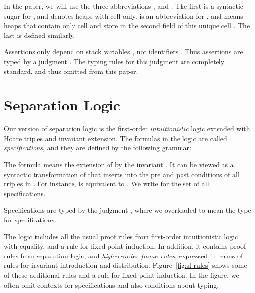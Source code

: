 \documentclass{LMCS}
\begin{document}
In the paper, we will use the three abbreviations 
, 
and . The first
 is a syntactic sugar for 
, and denotes heaps
with cell  only.
 is an abbreviation for
, and means
 heaps that contain only cell  and
store  in the second field of this unique cell .
The last  is defined similarly.

Assertions only depend on stack variables , not identifiers .
Thus assertions are typed by a judgment .  The typing rules for this judgment are completely standard, and
thus omitted from this paper.


\section{Separation Logic}
\label{sec:separation-logic}
Our version of separation logic is the first-order 
{\em intuitionistic\/} logic extended with Hoare triples 
and invariant extension.
The formulas in the logic are called {\em specifications},
and they are defined by the following grammar:
{

}
The formula  means
the extension of  by the invariant .
It can be viewed as 
a syntactic transformation of  that 
inserts  into the pre and post conditions of all triples 
in .  For instance, 
 is 
equivalent to 
.
We write  for the set of all specifications.

Specifications are typed by the judgment 
, where we
overloaded  to mean the type for specifications.

The logic includes all the usual proof rules from first-order
intuitionistic logic with equality, and a rule for fixed-point induction.
In addition, it contains proof rules from separation logic, and
\emph{higher-order frame rules}, expressed in terms of rules for invariant
introduction and distribution. Figure~\ref{fig:sl-rules} shows some of
these additional rules and a rule for fixed-point 
induction. In the figure, we often omit contexts  for specifications and also conditions about typing.
\end{document}
